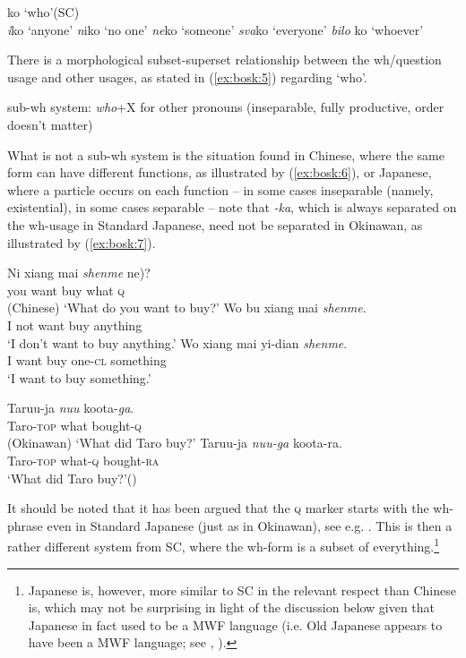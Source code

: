 \documentclass[output=paper,colorlinks,citecolor=brown]{langscibook}
\begin{document}
\ea\label{ex:bosk:4} \ea ko `who'\hfill{}(SC)\\
\ex \textit{i}ko `anyone'\label{ex:bosk:4a}
\ex \textit{n}iko `no one'\label{ex:bosk:4b}
\ex \textit{ne}ko `someone'\label{ex:bosk:4c}
\ex \textit{sva}ko `everyone'\label{ex:bosk:4d}
\ex \textit{bilo} ko `whoever'\label{ex:bosk:4e}
\z\z

\noindent There is a morphological subset-superset relationship between the wh/question usage and other usages, as stated in (\ref{ex:bosk:5}) regarding `who'.
 
\ea\label{ex:bosk:5} sub-wh system: \textit{who}+X for other pronouns (inseparable, fully productive, order doesn't matter)\z

\noindent What is not a sub-wh system is the situation found in Chinese, where the same form can have different functions, as illustrated by (\ref{ex:bosk:6}), or Japanese, where a particle occurs on each function -- in some cases inseparable (namely, existential), in some cases separable -- note that \textit{-ka}, which is always separated on the wh-usage in Standard Japanese, need not be separated in Okinawan, as illustrated by (\ref{ex:bosk:7}).
 
\ea\label{ex:bosk:6} \ea \gll Ni xiang mai \textit{shenme} \minsp{(} ne)?\\
you want  buy what {} \textsc{q}\\\hfill(Chinese)
\glt `What do you want to buy?'
\ex \gll Wo bu  xiang mai \textit{shenme}.\\
I not want buy anything\\
\glt `I don't want to buy anything.'
\ex \gll Wo xiang mai  yi-dian \textit{shenme}.\\
I want buy one-\textsc{cl}  something\\
\glt `I want to buy something.' 
\z\z 
 
\ea\label{ex:bosk:7} 
\ea \gll Taruu-ja \textit{nuu}   koota-\textit{ga}.\\
Taro-\textsc{top} what bought-\textsc{q}\\\hfill (Okinawan)
\glt `What did Taro buy?'
\ex \gll Taruu-ja \textit{nuu-ga} koota-ra.\\
Taro-\textsc{top} what-\textsc{q} bought-\textsc{ra}\\
\glt `What did Taro buy?'\hfill(\citealt{KinjoOseki2016}) 

\z\z

\noindent It should be noted that it has been argued that the \textsc{q} marker starts with the wh-phrase even in Standard Japanese (just as in Okinawan), see e.g. \citet{Hagstrom1998}. This is then a rather different system from SC, where the wh-form is a subset of everything.\footnote{Japanese is, however, more similar to SC in the relevant respect than Chinese is, which may not be surprising in light of the discussion below given that Japanese in fact used to be a MWF language (i.e. Old Japanese appears to have been a MWF language; see \citealt{Aldridge2009}, \citealt{Dadan2019}).}
\end{document}
